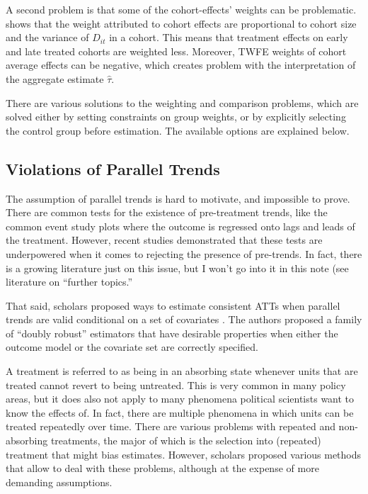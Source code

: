 \documentclass[hidelinks]{article}\usepackage[]{graphicx}\usepackage[]{xcolor}
\begin{document}
A second problem is that some of the cohort-effects' weights can be problematic. \textcite{GoodmanBacon2021} shows that the weight attributed to cohort effects are proportional to cohort size and the variance of $D_{it}$ in a cohort. This means that treatment effects on early and late treated cohorts are weighted less. Moreover, TWFE weights of cohort average effects can be negative, which creates problem with the interpretation of the aggregate estimate $\hat{\tau}$. 

There are various solutions to the weighting and comparison problems, which are solved either by setting constraints on group weights, or by explicitly selecting the control group before estimation. The available options are explained below.

\subsection{Violations of Parallel Trends}

The assumption of parallel trends is hard to motivate, and impossible to prove. There are common tests for the existence of pre-treatment trends, like the common event study plots where the outcome is regressed onto lags and leads of the treatment. However, recent studies demonstrated that these tests are underpowered when it comes to rejecting the presence of pre-trends. In fact, there is a growing literature just on this issue, but I won't go into it in this note (see literature on ``further topics.''

That said, scholars proposed ways to estimate consistent ATTs when parallel trends are valid conditional on a set of covariates \parencite{SantAnna2020}. The authors proposed a family of ``doubly robust'' estimators that have desirable properties when either the outcome model or the covariate set are correctly specified.

A treatment is referred to as being in an absorbing state whenever units that are treated cannot revert to being untreated. This is very common in many policy areas, but it does also not apply to many phenomena political scientists want to know the effects of. In fact, there are multiple phenomena in which units can be treated repeatedly over time. There are various problems with repeated and non-absorbing treatments, the major of which is the selection into (repeated) treatment that might bias estimates. However, scholars proposed various methods that allow to deal with these problems, although at the expense of more demanding assumptions.
\end{document}

